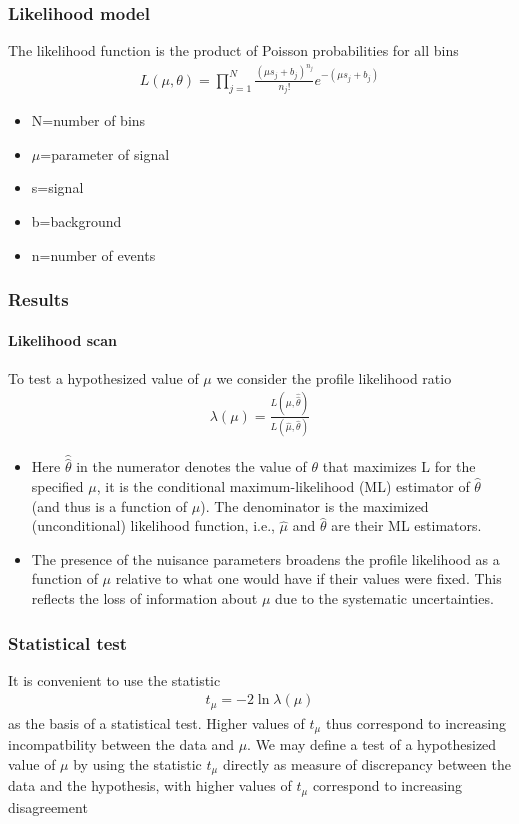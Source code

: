 \documentclass[11pt]{beamer}
\begin{document}
\begin{frame}
\frametitle{Likelihood model}
The likelihood function is the product of Poisson probabilities for all bins
\begin{align}
L(\mu,\theta)=\prod_{j=1}^{N}\frac{(\mu s_j +b_j)^{n_j}}{n_j !}e^{-(\mu s_j+b_j)}
\end{align}

\begin{itemize}
	\item	N=number of bins
	\item	$\mu$=parameter of signal
	\item	s=signal
	\item	b=background
	\item	n=number of events
\end{itemize}
\end{frame}

\begin{frame}
\frametitle{Results}
\framesubtitle{Likelihood scan}
To test a hypothesized value of $\mu$ we consider the profile likelihood ratio
\begin{align}
\lambda(\mu)=\frac{L(\mu,\hat{\hat{\theta}})}{L(\hat{\mu},\hat{\theta})}
\end{align}
\small{
	\begin{itemize}
		\item Here $\hat{\hat{\theta}} $ in the numerator denotes the value of $\theta$ that maximizes L for the specified $\mu$,
		it is the conditional maximum-likelihood (ML) estimator of $\hat{\theta}$ (and thus is a function of $\mu$).
		The denominator is the maximized (unconditional) likelihood function, i.e., $\hat{\mu}$ and $\hat{\theta}$ are
		their ML estimators\cite{3}. 
		\item The presence of the nuisance parameters broadens the profile likelihood as a
		function of $\mu$ relative to what one would have if their values were fixed. This reflects the loss
		of information about $\mu$ due to the systematic uncertainties\cite{3}\cite{4}. 
	\end{itemize}
}
\end{frame}

\begin{frame}
\frametitle{Statistical test}
It is convenient to use the statistic
\begin{align}
t_\mu=-2\ln{\lambda(\mu)} 
\end{align}
as the basis of a statistical test. Higher values of $t_\mu$ thus correspond to increasing
incompatbility between the data and $\mu$.
We may define a test of a hypothesized value of $\mu$ by using the statistic $t_\mu$ directly
as measure of discrepancy between the data and the hypothesis, with higher values of
$t_\mu$ correspond to increasing disagreement\cite{4}
\end{frame}
\end{document}
